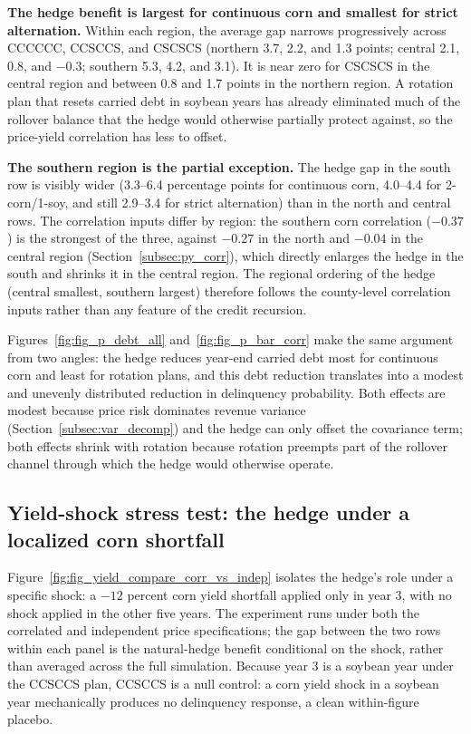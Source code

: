 \documentclass[11pt,letterpaper]{article}
\theoremstyle{remark}
\begin{document}
\textbf{The hedge benefit is largest for continuous corn and smallest for strict alternation.} Within each region, the average gap narrows progressively across CCCCCC, CCSCCS, and CSCSCS (northern 3.7, 2.2, and 1.3 points; central 2.1, 0.8, and $-0.3$; southern 5.3, 4.2, and 3.1). It is near zero for CSCSCS in the central region and between 0.8 and 1.7 points in the northern region. A rotation plan that resets carried debt in soybean years has already eliminated much of the rollover balance that the hedge would otherwise partially protect against, so the price-yield correlation has less to offset.
 
\textbf{The southern region is the partial exception.} The hedge gap in the south row is visibly wider (3.3--6.4 percentage points for continuous corn, 4.0--4.4 for 2-corn/1-soy, and still 2.9--3.4 for strict alternation) than in the north and central rows. The correlation inputs differ by region: the southern corn correlation ($-0.37$) is the strongest of the three, against $-0.27$ in the north and $-0.04$ in the central region (Section~\ref{subsec:py_corr}), which directly enlarges the hedge in the south and shrinks it in the central region. The regional ordering of the hedge (central smallest, southern largest) therefore follows the county-level correlation inputs rather than any feature of the credit recursion.
 
Figures~\ref{fig:fig_p_debt_all} and~\ref{fig:fig_p_bar_corr} make the same argument from two angles: the hedge reduces year-end carried debt most for continuous corn and least for rotation plans, and this debt reduction translates into a modest and unevenly distributed reduction in delinquency probability. Both effects are modest because price risk dominates revenue variance (Section~\ref{subsec:var_decomp}) and the hedge can only offset the covariance term; both effects shrink with rotation because rotation preempts part of the rollover channel through which the hedge would otherwise operate.
 
\subsection{\label{subsec:stress_test}Yield-shock stress test: the hedge under a localized corn shortfall}
 
Figure~\ref{fig:fig_yield_compare_corr_vs_indep} isolates the hedge's role under a specific shock: a $-12$ percent corn yield shortfall applied only in year 3, with no shock applied in the other five years. The experiment runs under both the correlated and independent price specifications; the gap between the two rows within each panel is the natural-hedge benefit conditional on the shock, rather than averaged across the full simulation. Because year 3 is a soybean year under the CCSCCS plan, CCSCCS is a null control: a corn yield shock in a soybean year mechanically produces no delinquency response, a clean within-figure placebo.
 
\end{document}
